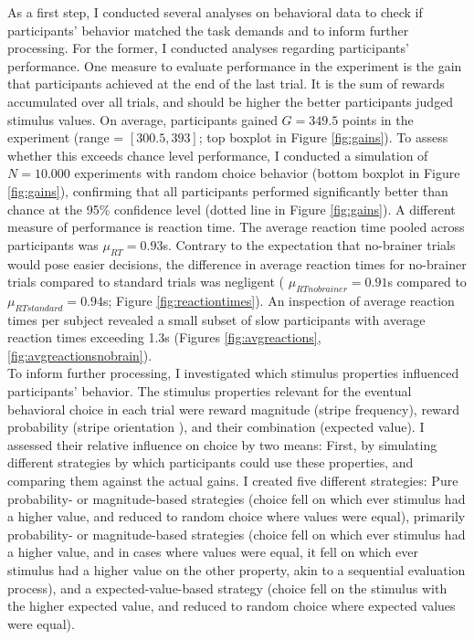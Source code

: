 As a first step, I conducted several analyses on behavioral data to check if participants' behavior matched the task demands and to inform further processing.
For the former, I conducted analyses regarding participants' performance.
One measure to evaluate performance in the experiment is the gain that participants achieved at the end of the last trial.
It is the sum of rewards accumulated over all trials, and should be higher the better participants judged stimulus values.
On average, participants gained $G=349.5$ points in the experiment (range = $[300.5, 393]$; top boxplot in Figure \ref{fig:gains}).
To assess whether this exceeds chance level performance, I conducted a simulation of $N=10.000$ experiments with random choice behavior (bottom boxplot in Figure \ref{fig:gains}), confirming that all participants performed significantly better than chance at the 95\% confidence level (dotted line in Figure \ref{fig:gains}).
A different measure of performance is reaction time.
The average reaction time pooled across participants was $\mu_{RT}=0.93$s.
Contrary to the expectation that no-brainer trials would pose easier decisions, the difference in average reaction times for no-brainer trials compared to standard trials was negligent ( $\mu_{RTnobrainer}=0.91$s compared to  $\mu_{RTstandard}=0.94$s; Figure \ref{fig:reactiontimes}).
An inspection of average reaction times per subject revealed a small subset of slow participants with average reaction times exceeding 1.3s (Figures \ref{fig:avgreactions}, \ref{fig:avgreactionsnobrain}).\\
To inform further processing, I investigated which stimulus properties influenced participants' behavior.
The stimulus properties relevant for the eventual behavioral choice in each trial were reward magnitude (stripe frequency), reward probability (stripe orientation ), and their combination (expected value).
I assessed their relative influence on choice by two means: First, by simulating different strategies by which participants could use these properties, and comparing them against the actual gains.
I created five different strategies: Pure probability- or magnitude-based strategies (choice fell on which ever stimulus had a higher value, and reduced to random choice where values were equal), primarily probability- or magnitude-based strategies (choice fell on which ever stimulus had a higher value, and in cases where values were equal, it fell on which ever stimulus had a higher value on the other property, akin to a sequential evaluation process), and a expected-value-based strategy (choice fell on the stimulus with the higher expected value, and reduced to random choice where expected values were equal).
